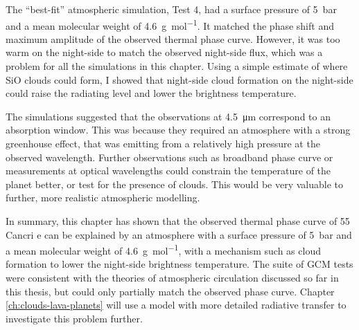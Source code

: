 The ``best-fit'' atmospheric simulation, Test 4, had a surface pressure of \SI{5}{\bar} and a mean molecular weight of \SI{4.6}{\gram\per\mole}. It matched the phase shift and maximum amplitude of the observed thermal phase curve. However, it was too warm on the night-side to match the observed night-side flux, which was a problem for all the simulations in this chapter. Using a simple estimate of where SiO clouds could form, I showed that night-side cloud formation on the night-side could raise the radiating level and lower the brightness temperature.

The simulations suggested that the observations at \SI{4.5}{\micro\metre} correspond to an absorption window. This was because they required an atmosphere with a strong greenhouse effect, that was emitting from a relatively high pressure at the observed wavelength. Further observations such as broadband phase curve or measurements at optical wavelengths could constrain the temperature of the planet better, or test for the presence of clouds. This would be very valuable to further, more realistic atmospheric modelling.

In summary, this chapter has shown that the observed thermal phase curve of 55 Cancri e can be explained by an atmosphere with a surface pressure of \SI{5}{\bar} and a mean molecular weight of \SI{4.6}{\gram\per\mole}, with a mechanism such as cloud formation to lower the night-side brightness temperature. The suite of GCM tests were consistent with the theories of atmospheric circulation discussed so far in this thesis, but could only partially match the observed phase curve. Chapter \ref{ch:clouds-lava-planets} will use a model with more detailed radiative transfer to investigate this problem further.




% 
% 
